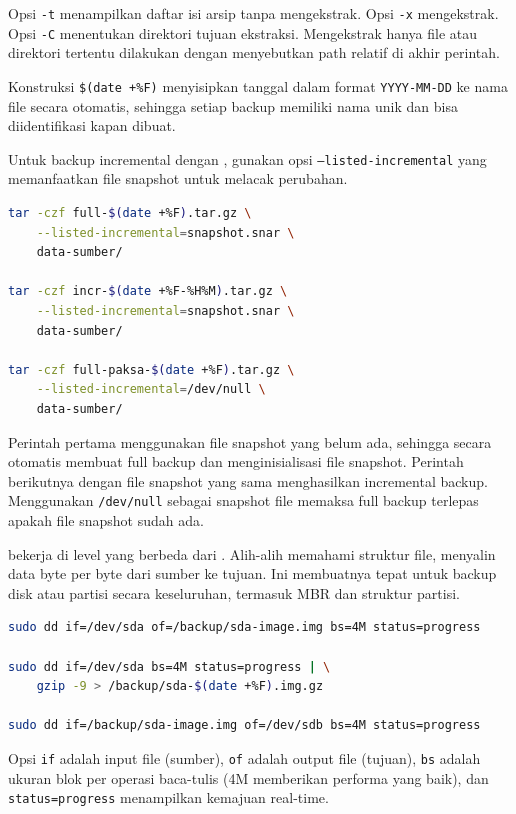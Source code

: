 Opsi \texttt{-t} menampilkan daftar isi arsip tanpa mengekstrak. Opsi \texttt{-x}
mengekstrak. Opsi \texttt{-C} menentukan direktori tujuan ekstraksi. Mengekstrak
hanya file atau direktori tertentu dilakukan dengan menyebutkan path relatif
di akhir perintah.

Konstruksi \texttt{\$(date +\%F)} menyisipkan tanggal dalam format
\texttt{YYYY-MM-DD} ke nama file secara otomatis, sehingga setiap backup memiliki
nama unik dan bisa diidentifikasi kapan dibuat.

Untuk backup incremental dengan , gunakan opsi \texttt{--listed-incremental}
yang memanfaatkan file snapshot untuk melacak perubahan.

\begin{lstlisting}[language=bash, caption={Backup incremental dengan snapshot file}]
tar -czf full-$(date +%F).tar.gz \
    --listed-incremental=snapshot.snar \
    data-sumber/

tar -czf incr-$(date +%F-%H%M).tar.gz \
    --listed-incremental=snapshot.snar \
    data-sumber/

tar -czf full-paksa-$(date +%F).tar.gz \
    --listed-incremental=/dev/null \
    data-sumber/
\end{lstlisting}

Perintah pertama menggunakan file snapshot yang belum ada, sehingga secara
otomatis membuat full backup dan menginisialisasi file snapshot. Perintah
berikutnya dengan file snapshot yang sama menghasilkan incremental backup.
Menggunakan \texttt{/dev/null} sebagai snapshot file memaksa full backup terlepas
apakah file snapshot sudah ada.

 bekerja di level yang berbeda dari \cmd{tar}. Alih-alih memahami
struktur file, \cmd{dd} menyalin data byte per byte dari sumber ke tujuan.
Ini membuatnya tepat untuk backup disk atau partisi secara keseluruhan, termasuk
MBR dan struktur partisi.

\begin{lstlisting}[language=bash, caption={Penggunaan dd untuk backup disk}]
sudo dd if=/dev/sda of=/backup/sda-image.img bs=4M status=progress

sudo dd if=/dev/sda bs=4M status=progress | \
    gzip -9 > /backup/sda-$(date +%F).img.gz

sudo dd if=/backup/sda-image.img of=/dev/sdb bs=4M status=progress
\end{lstlisting}

Opsi \texttt{if} adalah input file (sumber), \texttt{of} adalah output file
(tujuan), \texttt{bs} adalah ukuran blok per operasi baca-tulis (4M memberikan
performa yang baik), dan \texttt{status=progress} menampilkan kemajuan real-time.

